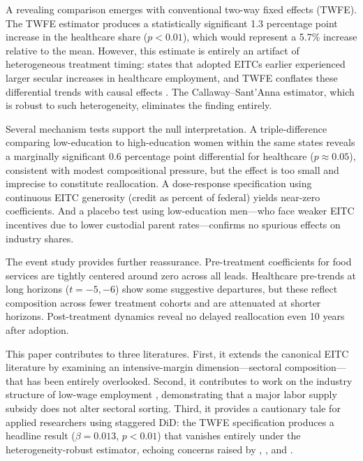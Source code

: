 \documentclass[12pt]{article}
\begin{document}
A revealing comparison emerges with conventional two-way fixed effects (TWFE). The TWFE estimator produces a statistically significant 1.3 percentage point increase in the healthcare share ($p < 0.01$), which would represent a 5.7\% increase relative to the mean. However, this estimate is entirely an artifact of heterogeneous treatment timing: states that adopted EITCs earlier experienced larger secular increases in healthcare employment, and TWFE conflates these differential trends with causal effects \citep{goodman2021}. The Callaway--Sant'Anna estimator, which is robust to such heterogeneity, eliminates the finding entirely.

Several mechanism tests support the null interpretation. A triple-difference comparing low-education to high-education women within the same states reveals a marginally significant 0.6 percentage point differential for healthcare ($p \approx 0.05$), consistent with modest compositional pressure, but the effect is too small and imprecise to constitute reallocation. A dose-response specification using continuous EITC generosity (credit as percent of federal) yields near-zero coefficients. And a placebo test using low-education men---who face weaker EITC incentives due to lower custodial parent rates---confirms no spurious effects on industry shares.

The event study provides further reassurance. Pre-treatment coefficients for food services are tightly centered around zero across all leads. Healthcare pre-trends at long horizons ($t = -5, -6$) show some suggestive departures, but these reflect composition across fewer treatment cohorts and are attenuated at shorter horizons. Post-treatment dynamics reveal no delayed reallocation even 10 years after adoption.

This paper contributes to three literatures. First, it extends the canonical EITC literature \citep{eissa1996, meyer2001, hotz2006, eissa2006, nichols2016, bastian2021} by examining an intensive-margin dimension---sectoral composition---that has been entirely overlooked. Second, it contributes to work on the industry structure of low-wage employment \citep{autor2003, autor2015, ross2017, dube2019}, demonstrating that a major labor supply subsidy does not alter sectoral sorting. Third, it provides a cautionary tale for applied researchers using staggered DiD: the TWFE specification produces a headline result ($\beta = 0.013$, $p < 0.01$) that vanishes entirely under the heterogeneity-robust estimator, echoing concerns raised by \citet{callaway2021}, \citet{sun2021}, and \citet{baker2022}.
\end{document}
